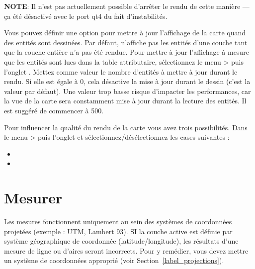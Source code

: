 \textbf{NOTE}: Il n'est pas actuellement possible d'arrêter le rendu de cette manière — ça été désactivé avec le port qt4 du fait d'instabilités.

\label{label_updatemap}

Vous pouvez définir une option pour mettre à jour l'affichage de la carte quand des entités sont dessinées. Par défaut, \qg n'affiche pas les entités d'une couche tant que la couche entière n'a pas été rendue. Pour mettre à jour l'affichage à mesure que les entités sont lues dans la table attributaire, sélectionnez le menu  >  puis l'onglet . Mettez comme valeur le nombre d'entités à mettre à jour durant le rendu. Si elle est égale à 0, cela désactive la mise à jour durant le dessin (c'est la valeur par défaut). Une valeur trop basse risque d'impacter les performances, car la vue de la carte sera constamment mise à jour durant la lecture des entités. Il est suggéré de commencer à 500.

\label{label_renderquality}

Pour influencer la qualité du rendu de la carte vous avez trois possibilités. Dans le menu  >  puis l'onglet  et sélectionnez/désélectionnez les cases suivantes :
\begin{itemize}[label=--]
\item {}
\item {}
\end{itemize}

\section{Mesurer}\label{sec:measure}

Les mesures fonctionnent uniquement au sein des systèmes de coordonnées projetées (exemple : UTM, Lambert 93). SI la couche active est définie par système géographique de coordonnée (latitude/longitude), les résultats d'une mesure de ligne ou d'aires seront incorrects. Pour y remédier, vous devez mettre un système de coordonnées approprié (voir Section~\ref{label_projections}).

